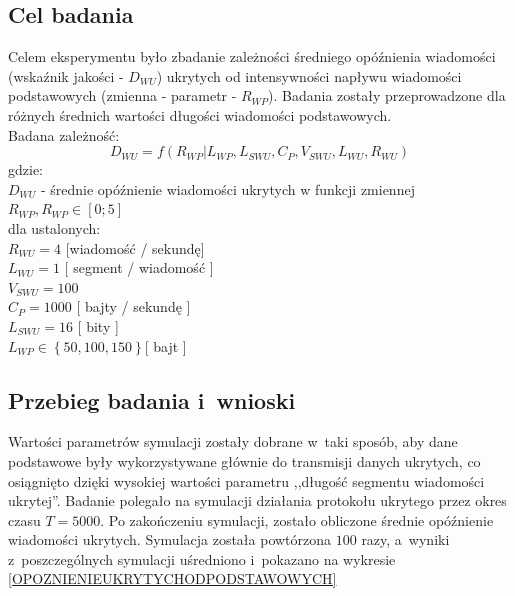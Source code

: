 \documentclass[a4paper, twoside, 12pt]{report}
\begin{document}
        \subsection{Cel badania}
            Celem eksperymentu było zbadanie zależności średniego opóźnienia wiadomości (wskaźnik jakości - \( D_{WU} \))
            ukrytych od intensywności napływu wiadomości podstawowych (zmienna - parametr - \(R_{WP}\)).
            Badania zostały przeprowadzone dla różnych średnich wartości długości wiadomości
            podstawowych. \\
            Badana zależność: \\
                $$ D_{WU} = f(R_{WP} | L_{WP}, L_{SWU}, C_P, V_{SWU}, L_{WU}, R_{WU}) $$
            gdzie:\\
                \( D_{WU} \) - średnie opóźnienie wiadomości ukrytych w funkcji zmiennej \( R_{WP}, R_{WP} \in [0;5]\) \\
                dla ustalonych: \\
                \( R_{WU}  = 4 \) [wiadomość / sekundę]  \\
                \( L_{WU}  = 1 \) [ segment / wiadomość ]\\
                \( V_{SWU}  = 100 \)\\
                \( C_P  = 1000 \) [ bajty / sekundę ]\\
                \( L_{SWU}  = 16 \) [ bity ]\\
                \( L_{WP}  \in \left\{50, 100, 150\right\} \)[ bajt ] \\
        \subsection{Przebieg badania i~wnioski}
            Wartości parametrów symulacji zostały dobrane w~taki sposób, aby dane podstawowe
            były wykorzystywane głównie do transmisji danych ukrytych, co osiągnięto
            dzięki wysokiej wartości parametru ,,długość segmentu wiadomości ukrytej''.
            Badanie polegało na symulacji działania protokołu ukrytego przez okres czasu
            \( T = 5000 \). Po zakończeniu symulacji, zostało obliczone
            średnie opóźnienie wiadomości ukrytych.
            Symulacja została powtórzona \( 100 \) razy, a~wyniki z~poszczególnych
            symulacji uśredniono i~pokazano na wykresie \ref{OPOZNIENIEUKRYTYCHODPODSTAWOWYCH}
\end{document}
